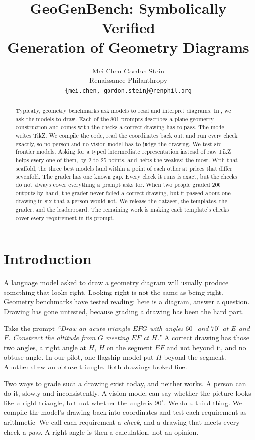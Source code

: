 \documentclass{article}
\title{GeoGenBench: Symbolically Verified \\ Generation of Geometry Diagrams}
\author{%
  Mei Chen \quad Gordon Stein \\
  Renaissance Philanthropy \\
  \texttt{\{mei.chen, gordon.stein\}@renphil.org}
}
\begin{document}
\maketitle

\begin{abstract}
Typically, geometry benchmarks ask models to read and interpret diagrams.
In \GeoGenBench, we ask the models to draw.
Each of the 801 prompts describes a plane-geometry construction and comes with the checks a correct drawing has to pass.
The model writes TikZ.
We compile the code, read the coordinates back out, and run every check exactly, so no person and no vision model has to judge the drawing.
We test six frontier models.
Asking for a typed intermediate representation instead of raw TikZ helps every one of them, by 2 to 25 points, and helps the weakest the most.
With that scaffold, the three best models land within a point of each other at prices that differ sevenfold.
The grader has one known gap.
Every check it runs is exact, but the checks do not always cover everything a prompt asks for.
When two people graded 200 outputs by hand, the grader never failed a correct drawing, but it passed about one drawing in six that a person would not.
We release the dataset, the templates, the grader, and the leaderboard.
The remaining work is making each template's checks cover every requirement in its prompt.
\end{abstract}

\section{Introduction}
\label{sec:intro}

A language model asked to draw a geometry diagram will usually produce something that looks right.
Looking right is not the same as being right.
Geometry benchmarks have tested reading: here is a diagram, answer a question.
Drawing has gone untested, because grading a drawing has been the hard part.

Take the prompt \textit{``Draw an acute triangle $EFG$ with angles $60^\circ$ and $70^\circ$ at $E$ and $F$. Construct the altitude from $G$ meeting $EF$ at $H$.''}
A correct drawing has those two angles, a right angle at $H$, $H$ on the segment $EF$ and not beyond it, and no obtuse angle.
In our pilot, one flagship model put $H$ beyond the segment.
Another drew an obtuse triangle.
Both drawings looked fine.

Two ways to grade such a drawing exist today, and neither works.
A person can do it, slowly and inconsistently.
A vision model can say whether the picture looks like a right triangle, but not whether the angle is $90^\circ$.
We do a third thing.
We compile the model's drawing back into coordinates and test each requirement as arithmetic.
We call each requirement a \emph{check}, and a drawing that meets every check a \emph{pass}.
A right angle is then a calculation, not an opinion.
\end{document}
